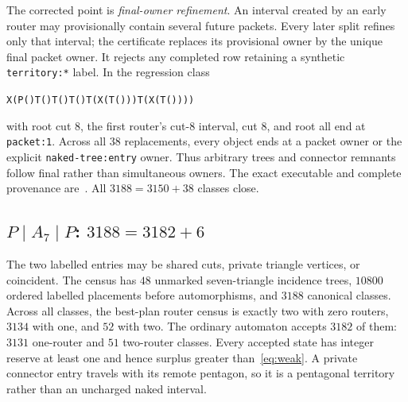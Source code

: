 \documentclass[11pt]{article}
\begin{document}
The corrected point is \emph{final-owner refinement}.  An interval created by
an early router may provisionally contain several future packets.  Every later
split refines only that interval; the certificate replaces its provisional
owner by the unique final packet owner.  It rejects any completed row retaining
a synthetic \texttt{territory:*} label.  In the regression class
\begin{center}
\texttt{X(P()T()T()T()T(X(T()))T(X(T())))}
\end{center}
with root cut $8$, the first router's cut-$8$ interval, cut $8$, and root all
end at \texttt{packet:1}.  Across all $38$ replacements, every object ends at a
packet owner or the explicit \texttt{naked-tree:entry} owner.  Thus arbitrary
trees and connector remnants follow final rather than simultaneous owners.
The exact executable and complete provenance are~\cite{Disconnected,T7PCode}.
All $3188=3150+38$ classes close.

\subsection{\texorpdfstring{$P\mid A_7\mid P$}{P | A7 | P}:
\texorpdfstring{$3188=3182+6$}{3188 = 3182 + 6}}

The two labelled entries may be shared cuts, private triangle vertices, or
coincident.  The census has $48$ unmarked seven-triangle incidence trees,
$10800$ ordered labelled placements before automorphisms, and $3188$ canonical
classes.  Across all classes, the best-plan router census is exactly two with
zero routers, $3134$ with one, and $52$ with two.  The ordinary automaton
accepts $3182$ of them: $3131$ one-router and $51$ two-router classes.  Every
accepted state has integer reserve at least one and hence surplus greater
than~\eqref{eq:weak}.  A private connector entry travels with its remote
pentagon, so it is a pentagonal territory rather than an uncharged naked
interval.
\end{document}
